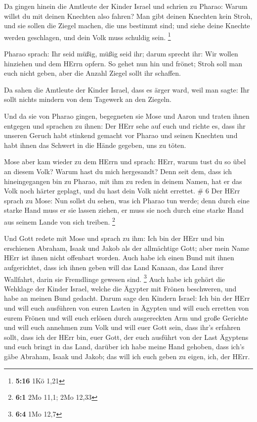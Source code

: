  Da gingen hinein die Amtleute der Kinder Israel und
schrien zu Pharao: Warum willst du mit deinen Knechten also fahren?
 Man gibt deinen Knechten kein Stroh, und sie sollen die
Ziegel machen, die uns bestimmt sind; und siehe deine Knechte werden
geschlagen, und dein Volk muss schuldig sein. \footnote{\textbf{5:16}
  1Kö 1,21}

 Pharao sprach: Ihr seid müßig, müßig seid ihr; darum
sprecht ihr: Wir wollen hinziehen und dem HErrn opfern.  So
gehet nun hin und frönet; Stroh soll man euch nicht geben, aber die
Anzahl Ziegel sollt ihr schaffen.

 Da sahen die Amtleute der Kinder Israel, dass es ärger
ward, weil man sagte: Ihr sollt nichts mindern von dem Tagewerk an den
Ziegeln.

 Und da sie von Pharao gingen, begegneten sie Mose und
Aaron und traten ihnen entgegen  und sprachen zu ihnen: Der
HErr sehe auf euch und richte es, dass ihr unseren Geruch habt stinkend
gemacht vor Pharao und seinen Knechten und habt ihnen das Schwert in die
Hände gegeben, uns zu töten.

 Mose aber kam wieder zu dem HErrn und sprach: HErr, warum
tust du so übel an diesem Volk? Warum hast du mich hergesandt?
 Denn seit dem, dass ich hineingegangen bin zu Pharao, mit
ihm zu reden in deinem Namen, hat er das Volk noch härter geplagt, und
du hast dein Volk nicht errettet. \# 6  Der HErr sprach zu
Mose: Nun sollst du sehen, was ich Pharao tun werde; denn durch eine
starke Hand muss er sie lassen ziehen, er muss sie noch durch eine
starke Hand aus seinem Lande von sich treiben. \footnote{\textbf{6:1}
  2Mo 11,1; 2Mo 12,33}

 Und Gott redete mit Mose und sprach zu ihm: Ich bin der
HErr  und bin erschienen Abraham, Isaak und Jakob als der
allmächtige Gott; aber mein Name HErr ist ihnen nicht offenbart worden.
 Auch habe ich einen Bund mit ihnen aufgerichtet, dass ich
ihnen geben will das Land Kanaan, das Land ihrer Wallfahrt, darin sie
Fremdlinge gewesen sind. \footnote{\textbf{6:4} 1Mo 12,7} 
Auch habe ich gehört die Wehklage der Kinder Israel, welche die Ägypter
mit Frönen beschweren, und habe an meinen Bund gedacht. 
Darum sage den Kindern Israel: Ich bin der HErr und will euch ausführen
von euren Lasten in Ägypten und will euch erretten von eurem Frönen und
will euch erlösen durch ausgereckten Arm und große Gerichte 
und will euch annehmen zum Volk und will euer Gott sein, dass ihr's
erfahren sollt, dass ich der HErr bin, euer Gott, der euch ausführt von
der Last Ägyptens  und euch bringt in das Land, darüber ich
habe meine Hand gehoben, dass ich's gäbe Abraham, Isaak und Jakob; das
will ich euch geben zu eigen, ich, der HErr.

